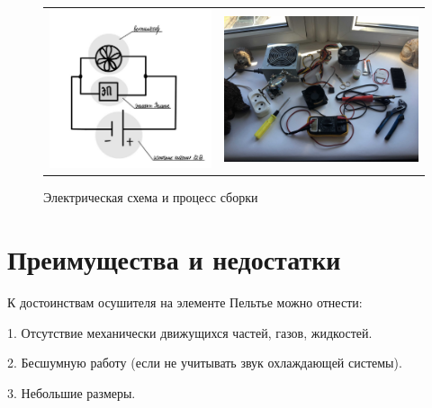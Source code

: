 \documentclass[a4paper,12pt]{article} %
\begin{document}
\begin{figure}[ht]\center
\begin{tabular}{cc}
\includegraphics[width=75mm]{ch.jpg}
&
\includegraphics[width=90mm]{xex.jpg}
\end{tabular}
\caption{Электрическая схема и процесс сборки}
\end{figure}

\newpage


\section{Преимущества и недостатки}

К достоинствам осушителя на элементе Пельтье можно отнести:

\hspace{5mm}
1. Отсутствие механически движущихся частей, газов, жидкостей.

\hspace{5mm}
2. Бесшумную работу (если не учитывать звук охлаждающей системы).

\hspace{5mm}
3. Небольшие размеры.
\end{document}
